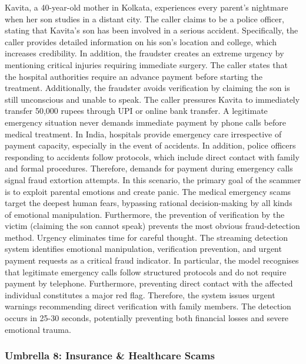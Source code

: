 \documentclass{article}
\begin{document}
Kavita, a 40-year-old mother in Kolkata, experiences every parent's nightmare when her son studies in a distant city. The caller claims to be a police officer, stating that Kavita's son has been involved in a serious accident. Specifically, the caller provides detailed information on his son's location and college, which increases credibility. In addition, the fraudster creates an extreme urgency by mentioning critical injuries requiring immediate surgery. The caller states that the hospital authorities require an advance payment before starting the treatment. Additionally, the fraudster avoids verification by claiming the son is still unconscious and unable to speak. The caller pressures Kavita to immediately transfer 50,000 rupees through UPI or online bank transfer. A legitimate emergency situation never demands immediate payment by phone calls before medical treatment. In India, hospitals provide emergency care irrespective of payment capacity, especially in the event of accidents. In addition, police officers responding to accidents follow protocols, which include direct contact with family and formal procedures. Therefore, demands for payment during emergency calls signal fraud extortion attempts. In this scenario, the primary goal of the scammer is to exploit parental emotions and create panic. The medical emergency scams target the deepest human fears, bypassing rational decision-making by all kinds of emotional manipulation. Furthermore, the prevention of verification by the victim (claiming the son cannot speak) prevents the most obvious fraud-detection method. Urgency eliminates time for careful thought. The streaming detection system identifies emotional manipulation, verification prevention, and urgent payment requests as a critical fraud indicator. In particular, the model recognises that legitimate emergency calls follow structured protocols and do not require payment by telephone. Furthermore, preventing direct contact with the affected individual constitutes a major red flag. Therefore, the system issues urgent warnings recommending direct verification with family members. The detection occurs in 25-30 seconds, potentially preventing both financial losses and severe emotional trauma.

\subsubsection{Umbrella 8: Insurance \& Healthcare Scams}
\label{app:casestudy:insurance}
\end{document}
